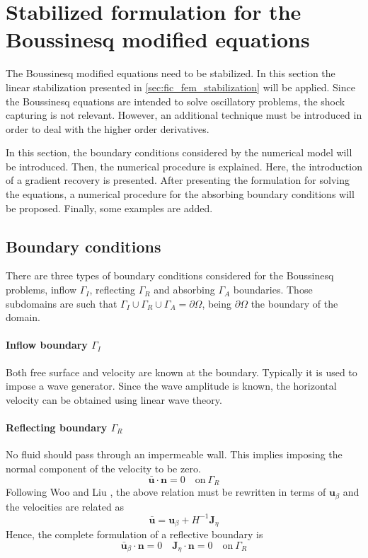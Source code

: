\section{Stabilized formulation for the Boussinesq modified equations}


The Boussinesq modified equations need to be stabilized. In this section the linear stabilization presented in \ref{sec:fic_fem_stabilization} will be applied. Since the Boussinesq equations are intended to solve oscillatory problems, the shock capturing is not relevant. However, an additional technique must be introduced in order to deal with the higher order derivatives.

In this section, the boundary conditions considered by the numerical model will be introduced. Then, the numerical procedure is explained. Here, the introduction of a gradient recovery is presented. After presenting the formulation for solving the equations, a numerical procedure for the absorbing boundary conditions will be proposed. Finally, some examples are added.



\subsection{Boundary conditions}


There are three types of boundary conditions considered for the Boussinesq problems, inflow $\Gamma_I$, reflecting $\Gamma_R$ and absorbing $\Gamma_A$ boundaries. Those subdomains are such that $\Gamma_I \cup \Gamma_R \cup \Gamma_A = \partial \Omega$, being $\partial\Omega$ the boundary of the domain.

\paragraph{Inflow boundary $\Gamma_I$} Both free surface and velocity are known at the boundary. Typically it is used to impose a wave generator. Since the wave amplitude is known, the horizontal velocity can be obtained using linear wave theory.

\paragraph{Reflecting boundary $\Gamma_R$} No fluid should pass through an impermeable wall. This implies imposing the normal component of the velocity to be zero.
\begin{equation*}
    \bar{\mathbf{u}} \cdot \mathbf{n} = 0 \quad \text{on} \ \Gamma_R
\end{equation*}
Following Woo and Liu \cite{woo2004a}, the above relation must be rewritten in terms of $\mathbf{u}_\beta$ and the velocities are related as
\begin{equation*}
    \bar{\mathbf{u}} = \mathbf{u}_\beta + H^{-1} \mathbf{J}_\eta
\end{equation*}
Hence, the complete formulation of a reflective boundary is
\begin{equation}
    \bar{\mathbf{u}}_\beta \cdot \mathbf{n} = 0 \quad
    \mathbf{J}_\eta \cdot \mathbf{n} = 0 \quad
    \text{on} \ \Gamma_R
\end{equation}


